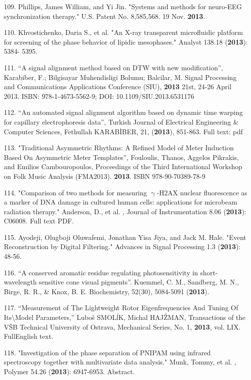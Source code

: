 109. Phillips, James William, and Yi Jin. "Systems and methods for neuro-EEG synchronization therapy." U.S. Patent No. 8,585,568. 19 Nov. \textbf{2013}.

110. Khvostichenko, Daria S., et al. "An X-ray transparent microfluidic platform for screening of the phase behavior of lipidic mesophases." Analyst 138.18 (\textbf{2013}): 5384- 5395.

111. ``A signal alignment method based on DTW with new modification'', Karabiber, F.; Bilgisayar Muhendisligi Bolumu; Balcilar, M. Signal Processing and Communications Applications Conference (SIU), \textbf{2013} 21st, 24-26 April 2013. ISBN: 978-1-4673-5562-9; DOI: 10.1109/SIU.2013.6531176

112. ``An automated signal alignment algorithm based on dynamic time warping for capillary electrophoresis data'', Turkish Journal of Electrical Engineering \& Computer Sciences, Fethullah KARAB\.{I}BER, 21, (\textbf{2013}), 851-863. Full text: pdf

113. "Traditional Asymmetric Rhythms: A Refined Model of Meter Induction Based On Asymmetric Meter Templates'', Fouloulis, Thanos, Aggelos Pikrakis, and Emilios Cambouropoulos, Proceedings of the Third International Workshop on Folk Music Analysis (FMA2013). \textbf{2013}. ISBN 978-90-70389-78-9

114. "Comparison of two methods for measuring ${\upgamma}$-H2AX nuclear fluorescence as a marker of DNA damage in cultured human cells: applications for microbeam radiation therapy." Anderson, D., et al. , Journal of Instrumentation 8.06 (\textbf{2013}): C06008. Full text PDF.

115. Ayodeji, Olugboji Oluwafemi, Jonathan Yisa Jiya, and Jack M. Hale. "Event Reconstruction by Digital Filtering." Advances in Signal Processing 1.3 (\textbf{2013}): 48-56.

116. ``A conserved aromatic residue regulating photosensitivity in short-wavelength sensitive cone visual pigments''. Kuemmel, C. M., Sandberg, M. N., Birge, R. R., \& Knox, B. E. Biochemistry, 52(30), 5084-5091 (\textbf{2013}).

117. ``Measurement of The Lightweight Rotor Eigenfrequencies And Tuning Of Its\textbackslash  Model Parameters,'' Lubo\v{s} SMOL\'{l}K, Michal HAJ\v{Z}MAN, Transactions of the V\v{S}B \textendash{} Technical University of Ostrava, Mechanical Series, No. 1, \textbf{2013}, vol. LIX. FullEnglish text.

118. "Investigation of the phase separation of PNIPAM using infrared spectroscopy together with multivariate data analysis." Munk, Tommy, et al. , Polymer 54.26 (\textbf{2013}): 6947-6953. Abstract.

